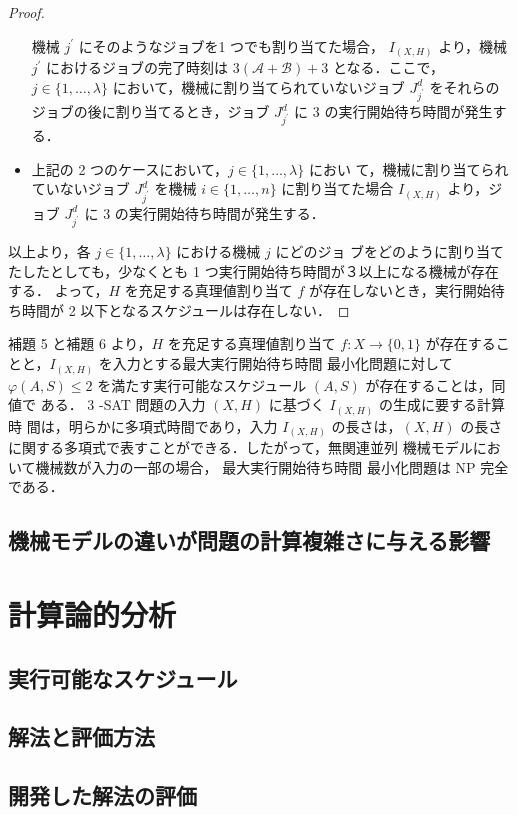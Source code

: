 \documentclass[12pt]{optlab-bachelor}
\begin{document}
\begin{proof}
\begin{itemize}
  機械 $j^{\prime}$ にそのようなジョブを1 つでも割り当てた場合，
  $I_{(X,H)}$ より，機械 $j^{\prime}$ におけるジョブの完了時刻は
  $3(\mathcal{A} + \mathcal{B}) + 3$ となる．ここで，$j \in
  \{1,\ldots,\lambda\}$ において，機械に割り当てられていないジョブ
  $J^d_{j^{\prime}}$ をそれらのジョブの後に割り当てるとき，ジョブ
  $J^d_{j^{\prime}}$ に 3 の実行開始待ち時間が発生する．
\item 上記の 2 つのケースにおいて，$j \in \{1,\ldots,\lambda\}$ におい
  て，機械に割り当てられていないジョブ $J^d_{j^{\prime}}$ を機械 $i
  \in \{1,\ldots,n\}$ に割り当てた場合 $I_{(X,H)}$ より，ジョブ
  $J^d_{j^{\prime}}$ に 3 の実行開始待ち時間が発生する．
\end{itemize}
以上より，各 $j \in \{1,\ldots,\lambda\}$ における機械 $j$ にどのジョ
ブをどのように割り当てたしたとしても，少なくとも 1 つ実行開始待ち時間が３以上になる機械が存在する．
よって，$H$ を充足する真理値割り当て $f$ が存在しないとき，実行開始待
ち時間が 2 以下となるスケジュールは存在しない．
\end{proof}

補題 5 と補題 6 より，$H$ を充足する真理値割り当て $f : X \to \{0,
1\}$ が存在することと，$I_{(X,H)}$ を入力とする最大実行開始待ち時間
最小化問題に対して $\varphi(A, S) \le 2$
を満たす実行可能なスケジュール $(A, S)$ が存在することは，同値で
ある．
3 -SAT 問題の入力 $(X,H)$ に基づく $I_{(X,H)}$ の生成に要する計算時
間は，明らかに多項式時間であり，入力 $I_{(X,H)}$ の長さは，$(X, H)$
の長さに関する多項式で表すことができる．したがって，無関連並列
機械モデルにおいて機械数が入力の一部の場合， 最大実行開始待ち時間
最小化問題は NP 完全である．

\section{機械モデルの違いが問題の計算複雑さに与える影響}

\chapter{計算論的分析}
\section{実行可能なスケジュール}
\section{解法と評価方法}
\section{開発した解法の評価}
\end{document}
